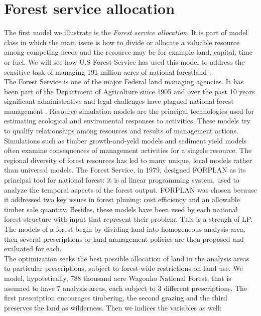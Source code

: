 \documentclass[a4paper,10 pt,titlepage,twoside]{book}
\theoremstyle{plain}
\theoremstyle{definition}
\theoremstyle{remark}
\begin{document}
\section{Forest service allocation} 
The first model we illustrate is the \textit{Forest service allocation}. It is part of model class in which the main issue is how to divide or allocate a valuable resource among competing needs and the resource may be for example land, capital, time or fuel. We will see how U.S Forest Service has used this model to address the sensitive task of managing 191 million acres of national forestland \cite{(Natural)}.\\
The Forest Service is one of the major Federal land managing agencies. It has been part of the Department of Agricolture since 1905 and over the past 10 years significant administrative and legal challenges have plagued national forest management \cite{ForSer}. Resource simulation models are the principal technologies used for estimating ecological and enviromental responses to activities. These models try to qualify relationships among resources and results of management actions. Simulations such as timber growth-and-yeld models and sediment yield models often examine consequences of management activities for a singele resource. The regional diversity of forest resources has led to many unique, local models rather than universal models. The Forest Service, in 1979, designed FORPLAN as its principal tool for national forest: it is al linear programming system, used to analyze the temporal aspects of the forest output. FORPLAN was chosen because it addressed two key issues in forest plnning: cost efficiency and an allowable timber sale quantity. Besides, these models have been used by each national forest structure with input that represent their problem. This is a strengh of LP. \\
The models of a forest begin  by dividing land into homogeneous analysis area, then several prescriptions or land management policies are then proposed and evaluated for each. \\The optimization seeks the best possible allocation of land in the analysis areas to particular prescriptions, subject to forest-wide restrictions on land use.
We model, hypotetically, 788 thousand acre Wagonho National Forest, that is assumed to have 7 analysis areas, each subject to 3 different prescriptions. The first prescription encourages timbering, the second grazing and the third preserves the land as wilderness. Then we indices the variables as well:
\end{document}

